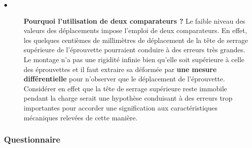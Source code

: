 \documentclass[lecture.tex]{subfiles}
\begin{document}
\begin{description}
\vspace{\baselineskip}

\item[$\bullet$] \textbf{Pourquoi l'utilisation de deux  comparateurs ?}
Le faible niveau des valeurs des déplacements impose l'emploi de deux comparateurs. En effet, les quelques centièmes de millimètres de déplacement de la tête de serrage supérieure de l'éprouvette pourraient conduire à des erreurs très grandes. Le montage n'a pas une rigidité infinie bien qu'elle soit supérieure à celle des éprouvettes et il faut extraire sa déformée par\textbf{ une mesure différentielle} pour n'observer que le déplacement de l'éprouvette.
Considérer en effet que la tête de serrage supérieure reste immobile pendant la charge serait une hypothèse conduisant à des erreurs trop importantes pour accorder une signification aux caractéristiques mécaniques relevées de cette manière.

\end{description}

\subsubsection{Questionnaire}
\end{document}

